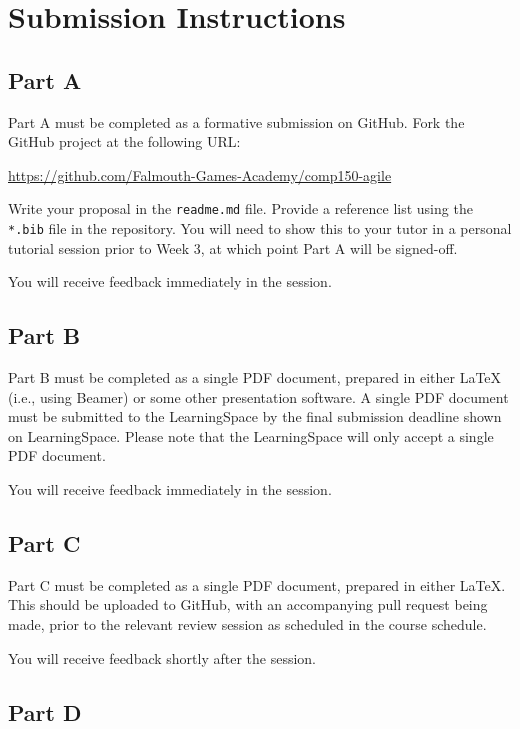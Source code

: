 \documentclass{../fal_assignment}
\begin{document}
\section*{Submission Instructions}

\subsection*{Part A}

Part A must be completed as a formative submission on GitHub. Fork the GitHub project at the following URL:

\indent \url{https://github.com/Falmouth-Games-Academy/comp150-agile}

Write your proposal in the \texttt{readme.md} file. Provide a reference list using the \texttt{*.bib} file in the repository. You will need to show this to your tutor in a personal tutorial session prior to Week 3, at which point Part A will be signed-off. 

You will receive feedback immediately in the session.

\subsection*{Part B}

Part B must be completed as a single PDF document, prepared in either LaTeX (i.e., using Beamer) or some other presentation software. A single PDF document must be submitted to the LearningSpace by the final submission deadline shown on LearningSpace. Please note that the LearningSpace will only accept a single PDF document. 

You will receive feedback immediately in the session.

\subsection*{Part C}

Part C must be completed as a single PDF document, prepared in either LaTeX. This should be uploaded to GitHub, with an accompanying pull request being made, prior to the relevant review session as scheduled in the course schedule. 

You will receive feedback shortly after the session.

\subsection*{Part D}
\end{document}
